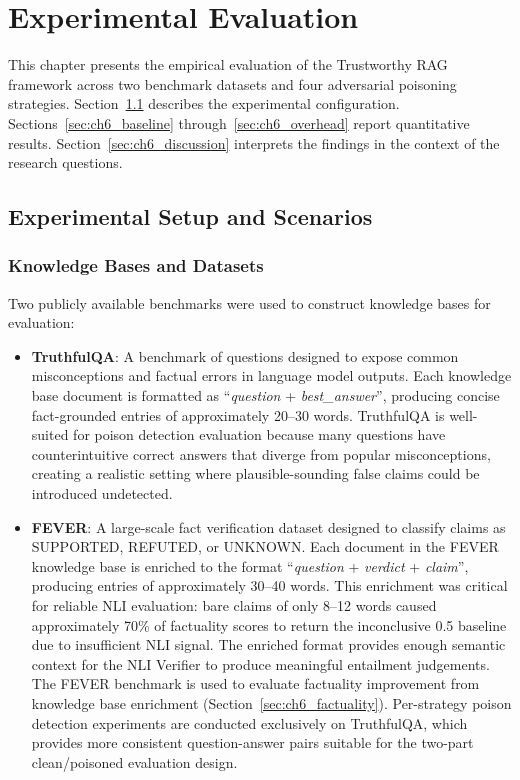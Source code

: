 \chapter{Experimental Evaluation}
\label{ch6_experiments}

This chapter presents the empirical evaluation of the Trustworthy RAG framework across
two benchmark datasets and four adversarial poisoning strategies. Section~\ref{sec:ch6_setup}
describes the experimental configuration. Sections~\ref{sec:ch6_baseline}
through~\ref{sec:ch6_overhead} report quantitative results. Section~\ref{sec:ch6_discussion}
interprets the findings in the context of the research questions.

\section{Experimental Setup and Scenarios}
\label{sec:ch6_setup}

\subsection{Knowledge Bases and Datasets}

Two publicly available benchmarks were used to construct knowledge bases for evaluation:

\begin{itemize}
    \item \textbf{TruthfulQA}: A benchmark of questions designed to expose common misconceptions
    and factual errors in language model outputs. Each knowledge base document is formatted as
    ``\textit{question} + \textit{best\_answer}'', producing concise fact-grounded entries of
    approximately 20--30 words. TruthfulQA is well-suited for poison detection evaluation
    because many questions have counterintuitive correct answers that diverge from popular
    misconceptions, creating a realistic setting where plausible-sounding false claims could
    be introduced undetected.

    \item \textbf{FEVER}: A large-scale fact verification dataset designed to classify claims
    as SUPPORTED, REFUTED, or UNKNOWN. Each document in the FEVER knowledge base is enriched
    to the format ``\textit{question} + \textit{verdict} + \textit{claim}'', producing entries
    of approximately 30--40 words. This enrichment was critical for reliable NLI evaluation:
    bare claims of only 8--12 words caused approximately 70\% of factuality scores to return
    the inconclusive 0.5 baseline due to insufficient NLI signal. The enriched format provides
    enough semantic context for the NLI Verifier to produce meaningful entailment judgements.
    The FEVER benchmark is used to evaluate factuality improvement from knowledge base
    enrichment (Section~\ref{sec:ch6_factuality}). Per-strategy poison detection experiments
    are conducted exclusively on TruthfulQA, which provides more consistent question-answer
    pairs suitable for the two-part clean/poisoned evaluation design.
\end{itemize}

